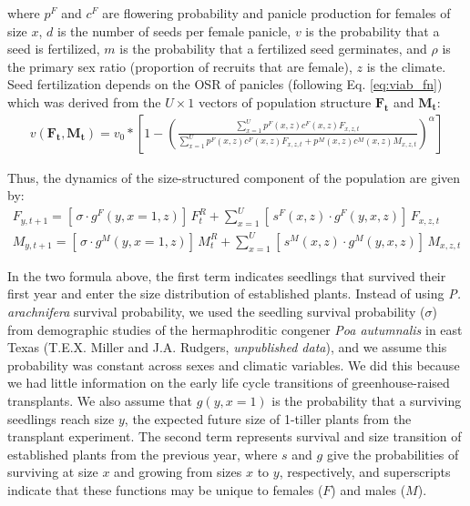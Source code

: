 \documentclass[12pt]{article}
\begin{document}
\noindent where $p^{F}$ and $c^{F}$ are flowering probability and panicle production for females of size $x$, $d$ is the number of seeds per female panicle, $v$ is the probability that a seed is fertilized, $m$ is the probability that a fertilized seed germinates, and $\rho$ is the primary sex ratio (proportion of recruits that are female), $z$ is the climate. 
Seed fertilization depends on the OSR of panicles (following Eq. \ref{eq:viab_fn}) which was derived from the $U \times 1$ vectors of population structure $\mathbf{F_{t}}$ and $\mathbf{M_{t}}$:
\begin{align}\label{eq:viab_MPM}
v(\mathbf{F_{t}},\mathbf{M_{t}}) = v_{0} * \left[ 1 - \left( \frac{\sum_{x=1}^{U} p^{F}(x,z) c^{F}(x,z) F_{x,z,t}}{\sum_{x=1}^{U} p^{F}(x,z) c^{F}(x,z) F_{x,z,t} + p^{M}(x,z) c^{M}(x,z) M_{x,z,t}} \right) ^{\alpha}\right]
\end{align}

Thus, the dynamics of the size-structured component of the population are given by:
\begin{align}\label{eq:dynamics}
F_{y,t+1} = [ \, \sigma \cdot g^{F}(y,x=1,z) ] \, F^{R}_{t} + \sum_{x=1}^{U} 	[ \, s^{F}(x,z) \cdot g^{F}(y,x,z)] \, F_{x,z,t}
\\
M_{y,t+1} = [ \, \sigma \cdot g^{M}(y,x=1,z) ] \, M^{R}_{t} + \sum_{x=1}^{U} 	[ \,  s^{M}(x,z) \cdot g^{M}(y,x,z) ] \, M_{x,z,t}
\end{align}

\noindent In the two formula above, the first term indicates seedlings that survived their first year and enter the size distribution of established plants.
Instead of using \textit{P. arachnifera} survival probability, we used the seedling survival probability ($\sigma$) from demographic studies of the hermaphroditic congener \textit{Poa autumnalis} in east Texas (T.E.X. Miller and J.A. Rudgers, \textit{unpublished data}), and we assume this probability was constant across sexes and climatic variables. 
We did this because we had little information on the early life cycle transitions of greenhouse-raised transplants.
We also assume that $g(y,x=1)$ is the probability that a surviving seedlings reach size $y$, the expected future size of 1-tiller plants from the transplant experiment.
The second term represents survival and size transition of established plants from the previous year, where $s$ and $g$ give the probabilities of surviving at size $x$ and growing from sizes $x$ to $y$, respectively, and superscripts indicate that these functions may be unique to females ($F$) and males ($M$).
\end{document}
